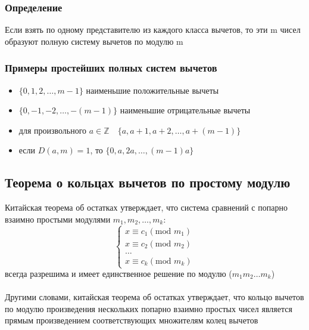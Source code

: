 \documentclass[12pt]{article}
\begin{document}
            \subsubsection{Определение}
            Если взять по одному представителю из каждого класса вычетов, то эти m чисел образуют полную систему вычетов по модулю m

            \subsubsection{Примеры простейших полных систем вычетов}
            \begin{itemize}
                \item $\{0, 1, 2, \dots, m-1\}$ наименьшие положительные вычеты
                \item $\{0, -1, -2, \dots, -(m-1)\}$ наименьшие отрицательные вычеты
                \item для произвольного $a \in \mathbb{Z} \quad\{a, a+1, a+2, \dots, a+(m-1)\}$
                \item если $D(a,m) = 1$, то $\{0, a, 2a, \dots, (m-1)a\}$
            \end{itemize}

            \subsection{Теорема о кольцах вычетов по простому модулю}

            Китайская теорема об остатках утверждает, что система сравнений с попарно взаимно простыми модулями
        $m_1, m_2, \dots, m_k$:\\
            \begin{equation*}
                \begin{cases}
                    x \equiv c_1  (\text{mod } m_1) \\
                    x \equiv c_2 (\text{mod } m_2)  \\
                    \dots                           \\
                    x \equiv c_k (\text{mod } m_k)
                \end{cases}
            \end{equation*}
            всегда разрешима и имеет единственное решение по модулю ($m_1m_2\dots m_k$)\\
            \\
            Другими словами, китайская теорема об остатках утверждает, что кольцо вычетов по модулю произведения нескольких попарно взаимно простых чисел является прямым произведением соответствующих множителям колец вычетов
\end{document}
